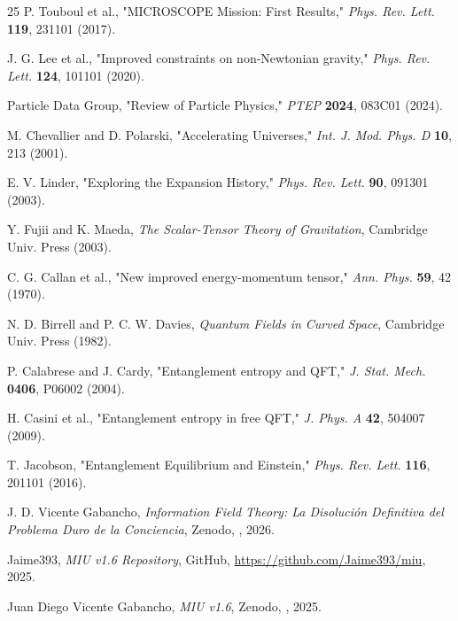 \documentclass[12pt, a4paper]{article}
\theoremstyle{miuThm}
\theoremstyle{remark}
\begin{document}
\begin{thebibliography}{25}
P. Touboul et al., "MICROSCOPE Mission: First Results,"
\textit{Phys. Rev. Lett.} \textbf{119}, 231101 (2017).

J. G. Lee et al., "Improved constraints on non-Newtonian gravity,"
\textit{Phys. Rev. Lett.} \textbf{124}, 101101 (2020).

Particle Data Group, "Review of Particle Physics," \textit{PTEP}
\textbf{2024}, 083C01 (2024).

M. Chevallier and D. Polarski, "Accelerating Universes,"
\textit{Int. J. Mod. Phys. D} \textbf{10}, 213 (2001).

E. V. Linder, "Exploring the Expansion History,"
\textit{Phys. Rev. Lett.} \textbf{90}, 091301 (2003).

Y. Fujii and K. Maeda, \textit{The Scalar-Tensor Theory of Gravitation},
Cambridge Univ. Press (2003).

C. G. Callan et al., "New improved energy-momentum tensor,"
\textit{Ann. Phys.} \textbf{59}, 42 (1970).

N. D. Birrell and P. C. W. Davies, \textit{Quantum Fields in Curved Space},
Cambridge Univ. Press (1982).

P. Calabrese and J. Cardy, "Entanglement entropy and QFT,"
\textit{J. Stat. Mech.} \textbf{0406}, P06002 (2004).

H. Casini et al., "Entanglement entropy in free QFT,"
\textit{J. Phys. A} \textbf{42}, 504007 (2009).

T. Jacobson, "Entanglement Equilibrium and Einstein,"
\textit{Phys. Rev. Lett.} \textbf{116}, 201101 (2016).

J. D. Vicente Gabancho, \textit{Information Field Theory: La Disolución Definitiva del Problema Duro de la Conciencia}, Zenodo, , 2026.

Jaime393, \textit{MIU v1.6 Repository}, GitHub, \url{https://github.com/Jaime393/miu}, 2025.

Juan Diego Vicente Gabancho, \textit{MIU v1.6}, Zenodo, , 2025.
\end{thebibliography}
\newpage
\end{document}
